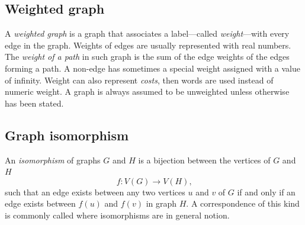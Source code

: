     \subsection{Weighted graph}
    
      A \emph{weighted graph} is a graph that associates a label---called \emph{weight}---with every edge in the graph. Weights of edges are usually represented with real numbers. The \emph{weight of a path} in such graph is the sum of the edge weights of the edges forming a path. A non-edge has sometimes a special weight assigned with a value of infinity. Weight can also represent \emph{costs}, then words are used instead of numeric weight. A graph is always assumed to be unweighted unless otherwise has been stated.
    
    \subsection{Graph isomorphism}
        
      An \emph{isomorphism} of graphs $G$ and $H$ is a bijection between the vertices of $G$ and $H$
      \begin{equation}
        f: V(G) \rightarrow V(H)\mbox{,}
      \end{equation}
      such that an edge exists between any two vertices $u$ and $v$ of $G$ if and only if an edge exists between $f(u)$ and $f(v)$ in graph $H$. A correspondence of this kind is commonly called  where isomorphisms are  in general notion.
        
